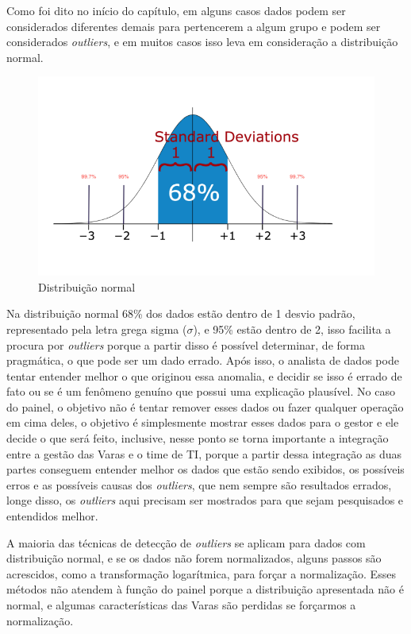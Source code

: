 Como foi dito no início do capítulo, em alguns casos dados podem ser considerados diferentes demais para pertencerem a algum grupo e podem ser considerados \textit{outliers}, e em muitos casos isso leva em consideração a distribuição normal. 

\begin{figure}[h]
	\centering
	\includegraphics[scale=0.50]{./figures/cap3/dist_normal.png}
	\caption{Distribuição normal}
\end{figure}

Na distribuição normal 68\% dos dados estão dentro de 1 desvio padrão, representado pela letra grega sigma ($\sigma$), e 95\% estão dentro de 2, isso facilita a procura por \textit{outliers} porque a partir disso é possível determinar, de forma pragmática, o que pode ser um dado errado. Após isso, o analista de dados pode tentar entender melhor o que originou essa anomalia, e decidir se isso é errado de fato ou se é um fenômeno genuíno que possui uma explicação plausível. No caso do painel, o objetivo não é tentar remover esses dados ou fazer qualquer operação em cima deles, o objetivo é simplesmente mostrar esses dados para o gestor e ele decide o que será feito, inclusive, nesse ponto se torna importante a integração entre a gestão das Varas e o time de TI, porque a partir dessa integração as duas partes conseguem entender melhor os dados que estão sendo exibidos, os possíveis erros e as possíveis causas dos \textit{outliers}, que nem sempre são resultados errados, longe disso, os \textit{outliers} aqui precisam ser mostrados para que sejam pesquisados e entendidos melhor.

A maioria das técnicas de detecção de \textit{outliers} se aplicam para dados com distribuição normal, e se os dados não forem normalizados, alguns passos são acrescidos, como a transformação logarítmica, para forçar a normalização. Esses métodos não atendem à função do painel porque a distribuição apresentada não é normal, e algumas características das Varas são perdidas se forçarmos a normalização.

